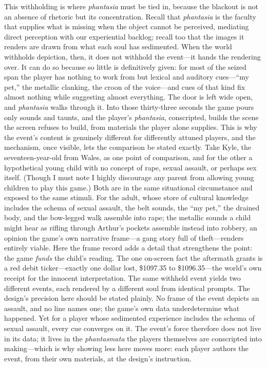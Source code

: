 This withholding is where \textit{phantasia} must be tied in, because the blackout is not an absence of rhetoric but its concentration. Recall that \textit{phantasia} is the faculty that supplies what is missing when the object cannot be perceived, mediating direct perception with our experiential backlog; recall too that the images it renders are drawn from what each soul has sedimented. When the world withholds depiction, then, it does not withhold the event---it hands the rendering over. It can do so because so little is definitively given: for most of the seized span the player has nothing to work from but lexical and auditory cues---``my pet,'' the metallic clanking, the croon of the voice---and cues of that kind fix almost nothing while suggesting almost everything. The door is left wide open, and \textit{phantasia} walks through it. Into those thirty-three seconds the game pours only sounds and taunts, and the player's \textit{phantasia}, conscripted, builds the scene the screen refuses to build, from materials the player alone supplies. This is why the event's content is genuinely different for differently attuned players, and the mechanism, once visible, lets the comparison be stated exactly. Take Kyle, the seventeen-year-old from Wales, as one point of comparison, and for the other a hypothetical young child with no concept of rape, sexual assault, or perhaps sex itself. (Though I must note I highly discourage any parent from allowing young children to play this game.) Both are in the same situational circumstance and exposed to the same stimuli. For the adult, whose store of cultural knowledge includes the schema of sexual assault, the belt sounds, the ``my pet,'' the drained body, and the bow-legged walk assemble into rape; the metallic sounds a child might hear as rifling through Arthur's pockets assemble instead into robbery, an opinion the game's own narrative frame---a gang story full of theft---renders entirely viable. Here the frame record adds a detail that strengthens the point: the game \textit{funds} the child's reading. The one on-screen fact the aftermath grants is a red debit ticker---exactly one dollar lost, \$1097.35 to \$1096.35---the world's own receipt for the innocent interpretation. The same withheld event yields two different events, each rendered by a different soul from identical prompts. The design's precision here should be stated plainly. No frame of the event depicts an assault, and no line names one; the game's own data underdetermine what happened. Yet for a player whose sedimented experience includes the schema of sexual assault, every cue converges on it. The event's force therefore does not live in its data; it lives in the \textit{phantasmata} the players themselves are conscripted into making---which is why showing less here moves more: each player authors the event, from their own materials, at the design's instruction.

